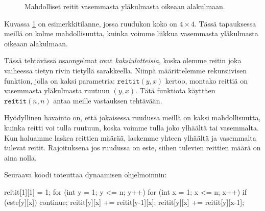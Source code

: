 \begin{figure}
\center
{}
\caption{Mahdolliset reitit vasemmasta yläkulmasta oikeaan alakulmaan.}
\label{fig:reiruu}
\end{figure}

Kuvassa \ref{fig:reiruu} on esimerkkitilanne, jossa ruudukon koko on $4 \times 4$.
Tässä tapauksessa meillä on kolme mahdollisuutta, kuinka voimme liikkua
vasemmasta yläkulmasta oikeaan alakulmaan.

Tässä tehtävässä osaongelmat ovat \emph{kaksiulotteisia},
koska olemme reitin joka vaiheessa tietyn rivin tietyllä sarakkeella.
Niinpä määritte\-lemme rekursiivisen funktion, jolla on kaksi
parametria: $\texttt{reitit}(y,x)$ kertoo, montako reittiä on
vasemmasta yläkulmasta ruutuun $(y,x)$.
Tätä funktiota käyttäen $\texttt{reitit}(n,n)$ antaa meille
vastauksen tehtävään.

Hyödyllinen havainto on, että jokaisessa ruudussa meillä on kaksi
mahdollisuutta, kuinka reitti voi tulla ruutuun,
koska voimme tulla joko ylhäältä tai vasemmalta.
Kun haluamme laskea reittien määrää, laskemme yhteen ylhäältä
ja vasemmalta tulevat reitit.
Rajoituksena jos ruudussa on este, siihen tulevien reittien
määrä on aina nolla.

Seuraava koodi toteuttaa dynaamisen ohjelmoinnin:

\begin{code}
reitit[1][1] = 1;
for (int y = 1; y <= n; y++) {
    for (int x = 1; x <= n; x++) {
        if (este[y][x]) continue;
        reitit[y][x] += reitit[y-1][x];
        reitit[y][x] += reitit[y][x-1];
    }
}
\end{code}


